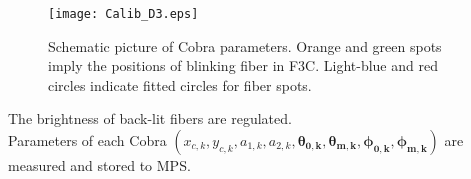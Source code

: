 \begin{figure}[!ht]
\begin{center}
\texttt{[image: Calib\_D3.eps]}
\end{center}
\caption{Schematic picture of Cobra parameters.
Orange and green spots imply the positions of blinking fiber in F3C.
Light-blue and red circles indicate fitted circles for fiber spots.
}
\label{fig:Cobraparams}
\end{figure}


\begin{itembox}[l]{}
The brightness of back-lit fibers are regulated. \\
Parameters of each Cobra $(x_{c,k}, y_{c,k}, a_{1,k}, a_{2,k}, \bm{\theta _{0,k}}, \bm{\theta _{m,k}}, \bm{\phi _{0,k}}, \bm{\phi _{m,k}})$ are measured and stored to MPS.

\end{itembox}